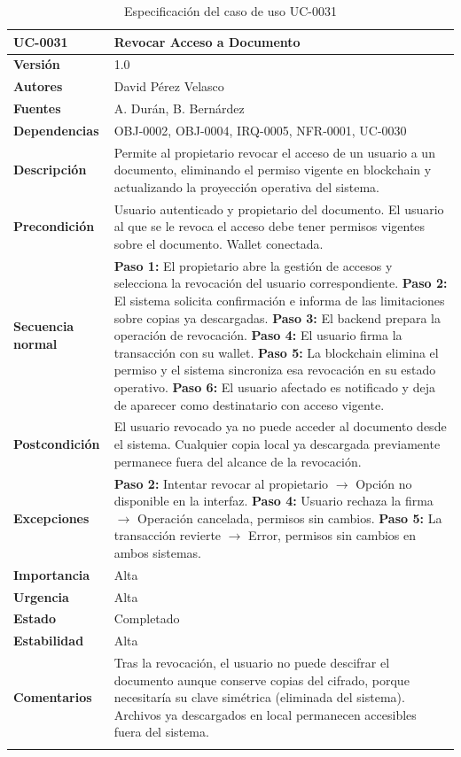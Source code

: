 \documentclass[11pt, a4paper]{article}
\begin{document}
\begin{longtable}{|p{4cm}|p{10cm}|}
\hline
\textbf{UC-0031} & Revocar Acceso a Documento \\
\hline
\textbf{Versión} & 1.0 \\
\hline
\textbf{Autores} & David Pérez Velasco \\
\hline
\textbf{Fuentes} & A. Durán, B. Bernárdez \\
\hline
\textbf{Dependencias} & OBJ-0002, OBJ-0004, IRQ-0005, NFR-0001, UC-0030 \\
\hline
\textbf{Descripción} & Permite al propietario revocar el acceso de un usuario a un documento, eliminando el permiso vigente en blockchain y actualizando la proyección operativa del sistema. \\
\hline
\textbf{Precondición} & Usuario autenticado y propietario del documento. El usuario al que se le revoca el acceso debe tener permisos vigentes sobre el documento. Wallet conectada. \\
\hline
\textbf{Secuencia normal} &
\textbf{Paso 1:} El propietario abre la gestión de accesos y selecciona la revocación del usuario correspondiente.\newline
\textbf{Paso 2:} El sistema solicita confirmación e informa de las limitaciones sobre copias ya descargadas.\newline
\textbf{Paso 3:} El backend prepara la operación de revocación.\newline
\textbf{Paso 4:} El usuario firma la transacción con su wallet.\newline
\textbf{Paso 5:} La blockchain elimina el permiso y el sistema sincroniza esa revocación en su estado operativo.\newline
\textbf{Paso 6:} El usuario afectado es notificado y deja de aparecer como destinatario con acceso vigente.\\
\hline
\textbf{Postcondición} & El usuario revocado ya no puede acceder al documento desde el sistema. Cualquier copia local ya descargada previamente permanece fuera del alcance de la revocación. \\
\hline
\textbf{Excepciones} &
\textbf{Paso 2:} Intentar revocar al propietario $\rightarrow$ Opción no disponible en la interfaz.\newline
\textbf{Paso 4:} Usuario rechaza la firma $\rightarrow$ Operación cancelada, permisos sin cambios.\newline
\textbf{Paso 5:} La transacción revierte $\rightarrow$ Error, permisos sin cambios en ambos sistemas.\\
\hline
\textbf{Importancia} & Alta \\
\hline
\textbf{Urgencia} & Alta \\
\hline
\textbf{Estado} & Completado \\
\hline
\textbf{Estabilidad} & Alta \\
\hline
\textbf{Comentarios} & Tras la revocación, el usuario no puede descifrar el documento aunque conserve copias del cifrado, porque necesitaría su clave simétrica (eliminada del sistema). Archivos ya descargados en local permanecen accesibles fuera del sistema. \\
\hline
\caption{Especificación del caso de uso UC-0031}
\end{longtable}
\end{document}
